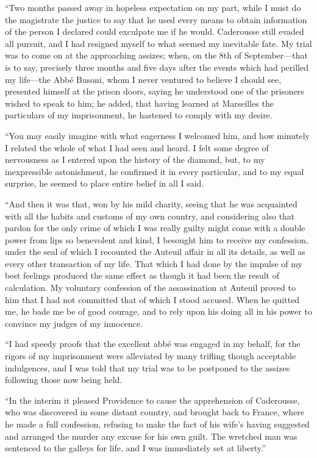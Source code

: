 “Two months passed away in hopeless expectation on my part, while I
must do the magistrate the justice to say that he used every means to
obtain information of the person I declared could exculpate me if he
would. Caderousse still evaded all pursuit, and I had resigned myself
to what seemed my inevitable fate. My trial was to come on at the
approaching assizes; when, on the 8th of September—that is to say,
precisely three months and five days after the events which had
perilled my life—the Abbé Busoni, whom I never ventured to believe I
should see, presented himself at the prison doors, saying he understood
one of the prisoners wished to speak to him; he added, that having
learned at Marseilles the particulars of my imprisonment, he hastened
to comply with my desire.

“You may easily imagine with what eagerness I welcomed him, and how
minutely I related the whole of what I had seen and heard. I felt some
degree of nervousness as I entered upon the history of the diamond,
but, to my inexpressible astonishment, he confirmed it in every
particular, and to my equal surprise, he seemed to place entire belief
in all I said.

“And then it was that, won by his mild charity, seeing that he was
acquainted with all the habits and customs of my own country, and
considering also that pardon for the only crime of which I was really
guilty might come with a double power from lips so benevolent and kind,
I besought him to receive my confession, under the seal of which I
recounted the Auteuil affair in all its details, as well as every other
transaction of my life. That which I had done by the impulse of my best
feelings produced the same effect as though it had been the result of
calculation. My voluntary confession of the assassination at Auteuil
proved to him that I had not committed that of which I stood accused.
When he quitted me, he bade me be of good courage, and to rely upon his
doing all in his power to convince my judges of my innocence.

“I had speedy proofs that the excellent abbé was engaged in my behalf,
for the rigors of my imprisonment were alleviated by many trifling
though acceptable indulgences, and I was told that my trial was to be
postponed to the assizes following those now being held.

“In the interim it pleased Providence to cause the apprehension of
Caderousse, who was discovered in some distant country, and brought
back to France, where he made a full confession, refusing to make the
fact of his wife’s having suggested and arranged the murder any excuse
for his own guilt. The wretched man was sentenced to the galleys for
life, and I was immediately set at liberty.”

